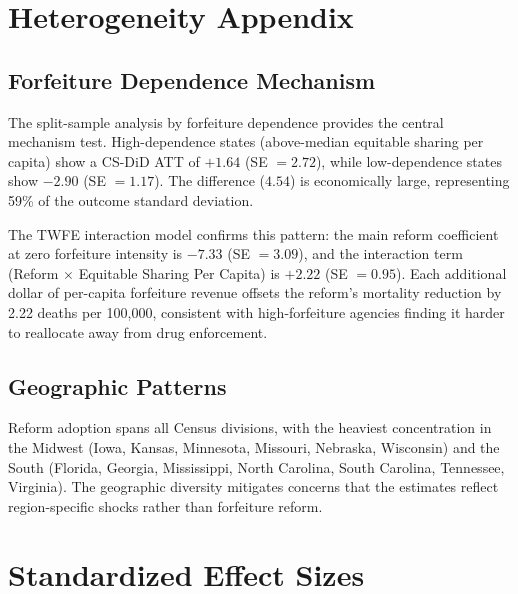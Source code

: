 \documentclass[12pt]{article}
\begin{document}
\section{Heterogeneity Appendix}
\label{app:het}

\subsection{Forfeiture Dependence Mechanism}

The split-sample analysis by forfeiture dependence provides the central mechanism test. High-dependence states (above-median equitable sharing per capita) show a CS-DiD ATT of $+1.64$ (SE $= 2.72$), while low-dependence states show $-2.90$ (SE $= 1.17$). The difference ($4.54$) is economically large, representing 59\% of the outcome standard deviation.

The TWFE interaction model confirms this pattern: the main reform coefficient at zero forfeiture intensity is $-7.33$ (SE $= 3.09$), and the interaction term (Reform $\times$ Equitable Sharing Per Capita) is $+2.22$ (SE $= 0.95$). Each additional dollar of per-capita forfeiture revenue offsets the reform's mortality reduction by 2.22 deaths per 100,000, consistent with high-forfeiture agencies finding it harder to reallocate away from drug enforcement.

\subsection{Geographic Patterns}

Reform adoption spans all Census divisions, with the heaviest concentration in the Midwest (Iowa, Kansas, Minnesota, Missouri, Nebraska, Wisconsin) and the South (Florida, Georgia, Mississippi, North Carolina, South Carolina, Tennessee, Virginia). The geographic diversity mitigates concerns that the estimates reflect region-specific shocks rather than forfeiture reform.


\section{Standardized Effect Sizes}
\label{sec:sde}
\end{document}
